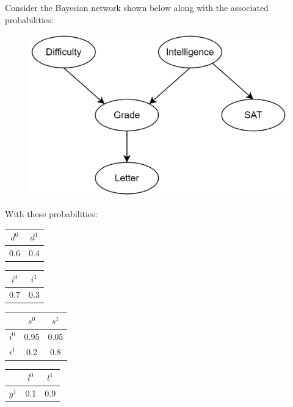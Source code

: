 \begin{example}
    Consider the Bayesian network shown below along with the associated probabilities:
    \begin{figure}[H]
        \centering
        \includegraphics[width=0.5\linewidth]{images/bay.png}
    \end{figure}
    With these probabilities: 
    \begin{table}[H]
        \centering
        \begin{tabular}{|cc|}
        \hline
        $d^0$ & $d^1$ \\ \hline
        0.6   & 0.4   \\ \hline
        \end{tabular}
    \end{table}
    \begin{table}[H]
        \centering
        \begin{tabular}{|cc|}
        \hline
        $i^0$ & $i^1$ \\ \hline
        0.7   & 0.3   \\ \hline
        \end{tabular}
    \end{table}
    \begin{table}[H]
        \centering
        \begin{tabular}{c|cc|}
        \cline{2-3}
                                    & $s^0$ & $s^1$ \\ \hline
        \multicolumn{1}{|c|}{$i^0$} & 0.95  & 0.05  \\
        \multicolumn{1}{|c|}{$i^1$} & 0.2   & 0.8   \\ \hline
        \end{tabular}
    \end{table}
    \begin{table}[H]
        \centering
        \begin{tabular}{c|cc|}
        \cline{2-3}
                                    & $l^0$ & $l^1$ \\ \hline
        \multicolumn{1}{|c|}{$g^1$} & 0.1   & 0.9   \\

\end{tabular}
\end{table}
\end{example}
